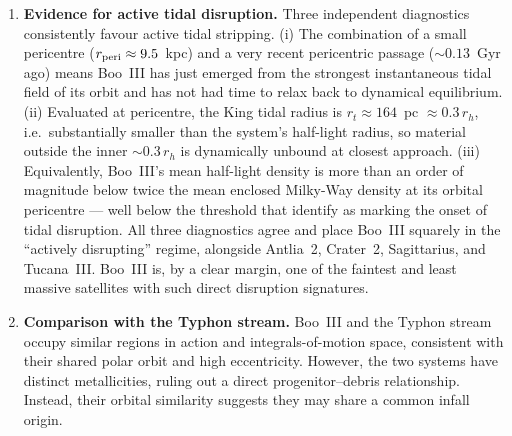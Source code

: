 \documentclass[twocolumn, apj, numberedappendix, appendixfloats]{openjournal_dhayaa}
\begin{document}
\begin{enumerate}[leftmargin=*]
\item \textbf{Evidence for active tidal disruption.} Three independent diagnostics consistently favour active tidal stripping. (i) The combination of a small pericentre ($r_{\rm peri} \approx 9.5$~kpc) and a very recent pericentric passage ($\sim 0.13$~Gyr ago) means Boo~III has just emerged from the strongest instantaneous tidal field of its orbit and has not had time to relax back to dynamical equilibrium. (ii) Evaluated at pericentre, the King tidal radius is $r_t \approx 164$~pc $\approx 0.3\,r_h$, i.e.\ substantially smaller than the system's half-light radius, so material outside the inner $\sim 0.3\,r_h$ is dynamically unbound at closest approach. (iii) Equivalently, Boo~III's mean half-light density is more than an order of magnitude below twice the mean enclosed Milky-Way density at its orbital pericentre --- well below the threshold that \citet{Pace2022} identify as marking the onset of tidal disruption. All three diagnostics agree and place Boo~III squarely in the ``actively disrupting'' regime, alongside Antlia~2, Crater~2, Sagittarius, and Tucana~III. Boo~III is, by a clear margin, one of the faintest and least massive satellites with such direct disruption signatures.

\item \textbf{Comparison with the Typhon stream.} Boo~III and the Typhon stream occupy similar regions in action and integrals-of-motion space, consistent with their shared polar orbit and high eccentricity. However, the two systems have distinct metallicities, ruling out a direct progenitor--debris relationship. Instead, their orbital similarity suggests they may share a common infall origin.


\end{enumerate}
\end{document}
